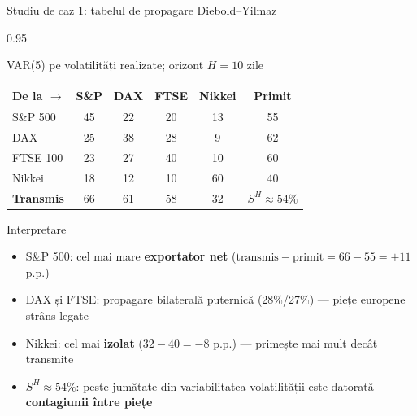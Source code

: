 \documentclass[9pt, aspectratio=169, t]{beamer}
\begin{document}
\begin{frame}{Studiu de caz 1: tabelul de propagare Diebold--Yilmaz}
    \begin{cminipage}{0.95\textwidth}
    \vspace{-2mm}
    {\footnotesize
    \begin{block}{VAR(5) pe volatilități realizate; orizont $H = 10$ zile}
        \vspace{0.1cm}
        {\small
        \begin{center}
        \begin{tabular}{l|cccc|c}
            \hline
            \textbf{De la $\rightarrow$} & S\&P & DAX & FTSE & Nikkei & \textbf{Primit} \\
            \hline
            S\&P 500  & 45 & 22 & 20 & 13 & 55 \\
            DAX       & 25 & 38 & 28 &  9 & 62 \\
            FTSE 100  & 23 & 27 & 40 & 10 & 60 \\
            Nikkei    & 18 & 12 & 10 & 60 & 40 \\
            \hline
            \textbf{Transmis} & 66 & 61 & 58 & 32 & $S^H \approx 54\%$ \\
            \hline
        \end{tabular}
        \end{center}
        }
    \end{block}
    \begin{alertblock}{Interpretare}
        \begin{itemize}\setlength{\itemsep}{0pt}
            \item S\&P 500: cel mai mare \textbf{exportator net} ($\text{transmis} - \text{primit} = 66 - 55 = +11$ p.p.)
            \item DAX și FTSE: propagare bilaterală puternică (28\%/27\%) --- piețe europene strâns legate
            \item Nikkei: cel mai \textbf{izolat} ($32 - 40 = -8$ p.p.) --- primește mai mult decât transmite
            \item $S^H \approx 54\%$: peste jumătate din variabilitatea volatilității este datorată \textbf{contagiunii între piețe}
        \end{itemize}
    \end{alertblock}
    }
    \end{cminipage}
    \hfill{}
\end{frame}
\end{document}

